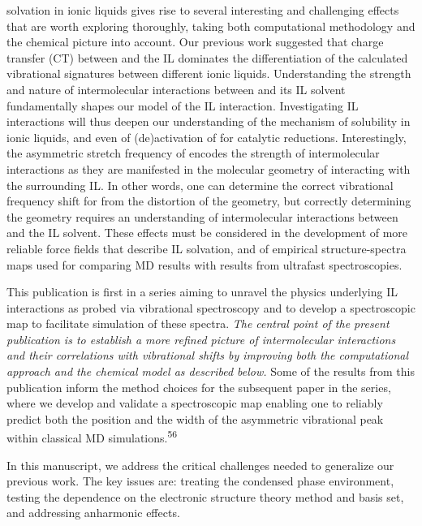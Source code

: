  solvation in ionic liquids gives rise to several interesting and challenging effects that are worth exploring thoroughly, taking both computational methodology and the chemical picture into account. Our previous work suggested that charge transfer (CT) between  and the IL dominates the differentiation of the calculated vibrational signatures between different ionic liquids. Understanding the strength and nature of intermolecular interactions between  and its IL solvent fundamentally shapes our model of the \textendash{}IL interaction. Investigating \textendash{}IL interactions will thus deepen our understanding of the mechanism of  solubility in ionic liquids, and even of (de)activation of  for catalytic reductions. Interestingly, the asymmetric stretch frequency of  encodes the strength of intermolecular interactions as they are manifested in the molecular geometry of  interacting with the surrounding IL. In other words, one can determine the correct vibrational frequency shift for  from the distortion of the  geometry, but correctly determining the  geometry requires an understanding of intermolecular interactions between  and the IL solvent. These effects must be considered in the development of more reliable force fields that describe \textendash{}IL solvation, and of empirical structure-spectra maps used for comparing MD results with results from ultrafast spectroscopies.

This publication is first in a series aiming to unravel the physics underlying \textendash{}IL interactions as probed via vibrational spectroscopy and to develop a spectroscopic map to facilitate simulation of these spectra. \emph{The central point of the present publication is to establish a more refined picture of intermolecular interactions and their correlations with vibrational shifts by improving both the computational approach and the chemical model as described below.} Some of the results from this publication inform the method choices for the subsequent paper in the series, where we develop and validate a spectroscopic map enabling one to reliably predict both the position and the width of the  asymmetric vibrational peak within classical MD simulations.\textsuperscript{56}

In this manuscript, we address the critical challenges needed to generalize our previous work. The key issues are: treating the condensed phase environment, testing the dependence on the electronic structure theory method and basis set, and addressing anharmonic effects.

